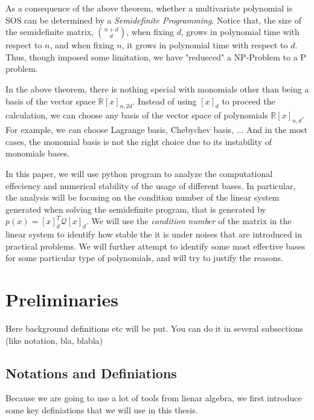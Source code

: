 \documentclass[12pt]{amsart}
\numberwithin{equation}{section}
\theoremstyle{definition}
\numberwithin{thm}{section}
\begin{document}
\cite{Blekherman:Parrilo:Thomas}

\cite{Laurent:Survey}

As a consequence of the above theorem, whether a multivariate polynomial is SOS can be determined 
by a \emph{Semidefinite Programming}. Notice that, the size of the semidefinite matrix,
${n+d \choose d}$, when fixing $d$, grows in polynomial time with respect to $n$, and when 
fixing $n$, it grows in polynomial time with respect to $d$. Thus, though imposed some 
limitation, we have "redueced" a NP-Problem to a P problem. 

In the above theorem, there is nothing special with monomials other than being a basis of the vector space $\mathbb{R}[x]_{n,2d}$. 
Instead of using $[x]_d$ to proceed the calculation,
we can choose any basis of the vector space of polynomials $\mathbb{R}[x]_{n,d}$. 
For example, we can choose Lagrange basis, Chebychev basis, ... And in the most cases,
the monomial basis is not the right choice due to its instability of monomials bases.

In this paper, we will use python program to analyze the computational effeciency and 
numerical stability of the usage of different bases. In particular, the analysis will
be focusing on the condition number of the linear system generated when solving the 
semidefinite program, that is generated by $p(x) = [x]_d^T \mathcal{Q} [x]_d $. 
We will use the \emph{condition number} of the matrix in the linear system to identify how stable the
it is under noises that are introduced in practical problems.  
We will further attempt to identify some most effective bases for some particular
type of polynomials, and will try to justify the reasons.  


\newpage

\section{Preliminaries}
\label{Sec:Preliminaries}

Here background definitions etc will be put. 
You can do it in several subsections (like notation, bla, blabla)

\subsection{Notations and Definiations}
\label{Sec:Notations and Definiations}

Because we are going to use a lot of tools from lienar algebra, we first introduce some key definiations that we will use in this thesis.
\end{document}
